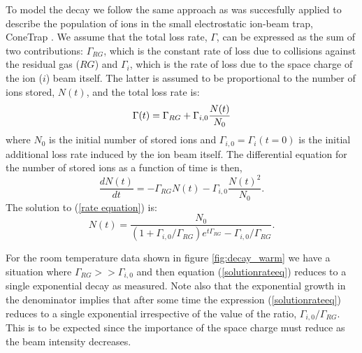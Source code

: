 \documentclass[aps,pra,preprint,superscriptaddress]{revtex4}
\begin{document}
To model the decay we follow the same approach as was succesfully applied to describe the population of ions in the small electrostatic ion-beam trap, ConeTrap \cite{Reinhed2010}.
We assume that the total loss rate, $\Gamma$, can be expressed as the sum of two contributions: $\Gamma_{RG}$, which is the constant rate of loss due to collisions against the residual gas ($RG$) and $\Gamma_{i}$, which is the rate of loss due to the space charge of the ion ($i$) beam itself. The latter is assumed to be proportional to the number of ions stored, $N(t)$, and the total loss rate is:
\begin{equation}
\Gamma(t) = \Gamma_{RG} + \Gamma_{i,0} {N(t) \over N_0}
\label{eqn:Gamma}
\end{equation}
where $N_0$ is the initial number of stored ions and $\Gamma_{i,0}=\Gamma_{i}(t=0)$ is the initial additional loss rate induced by the ion beam itself.
The differential equation for the number of stored ions as a function of time is then,
\begin{equation}\label{rate equation}
\frac{dN(t)}{dt}=-\Gamma_{RG} N(t)-\Gamma_{i,0}\frac{N(t)^2}{N_0}.
\end{equation}
The solution to (\ref{rate equation}) is:
\begin{equation}\label{solutionrateeq}
N(t)=\frac{N_0}{(1+\Gamma_{i,0}/\Gamma_{RG}) e^{t \Gamma_{RG}}-\Gamma_{i,0}/\Gamma_{RG}}.
\end{equation}

For the room temperature data shown in figure \ref{fig:decay_warm} we have a situation where $\Gamma_{RG} >> \Gamma_{i,0}$ and then equation (\ref{solutionrateeq}) reduces to a single exponential decay as measured. Note also that the exponential growth in the denominator implies that after some time the expression (\ref{solutionrateeq}) reduces to a single exponential irrespective of the value of the ratio, $\Gamma_{i,0}/\Gamma_{RG}$. This is to be expected since the importance of the space charge must reduce as the beam intensity decreases.
\end{document}
